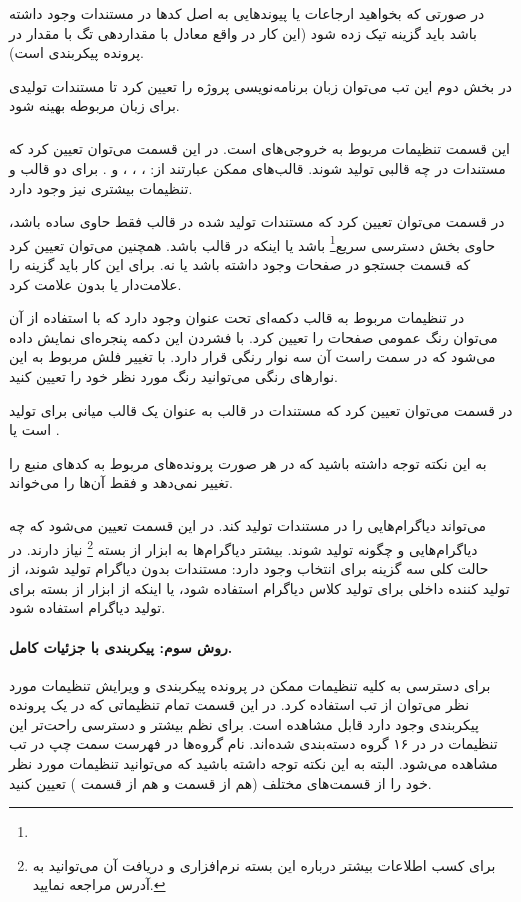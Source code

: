 در صورتی که بخواهید ارجاعات یا پیوندهایی به اصل کدها در مستندات وجود داشته باشد باید 
گزینه  تیک زده شود (این کار در واقع معادل با مقداردهی 
تگ  با مقدار  در پرونده پیکربندی است).

در بخش دوم این تب می‌توان زبان برنامه‌نویسی پروژه را تعیین کرد تا مستندات تولیدی برای زبان مربوطه بهینه شود.
\subparagraph{}
این قسمت تنظیمات مربوط به خروجی‌های  است. در این قسمت می‌توان تعیین کرد که مستندات 
در چه قالبی تولید شوند. قالب‌های ممکن عبارتند از: ، \lr{\LaTeX}، ،  و . 
برای دو قالب  و \lr{\LaTeX} تنظیمات بیشتری نیز وجود دارد.

در قسمت  می‌توان تعیین کرد که مستندات تولید شده در قالب  فقط حاوی  ساده باشد، حاوی 
بخش دسترسی سریع\footnote{} باشد یا اینکه در قالب  باشد. همچنین می‌توان تعیین کرد که 
قسمت جستجو در صفحات  وجود داشته باشد یا نه. برای این کار باید گزینه  را علامت‌دار 
یا بدون علامت کرد.

در تنظیمات مربوط به قالب  دکمه‌ای تحت عنوان  وجود دارد که با استفاده از آن می‌توان 
رنگ عمومی صفحات  را تعیین کرد. با فشردن این دکمه پنجره‌ای نمایش داده می‌شود که در سمت راست آن سه نوار رنگی 
قرار دارد. با تغییر فلش مربوط به این نوارهای رنگی می‌توانید رنگ مورد نظر خود را تعیین کنید.


در قسمت  می‌توان تعیین کرد که مستندات در قالب \lr{\LaTeX} به عنوان یک قالب میانی برای تولید  است 
یا .

به این نکته توجه داشته باشید که در هر صورت  پرونده‌های مربوط به کدهای منبع را تغییر نمی‌دهد و فقط آن‌ها 
را می‌خواند.
\subparagraph{}
\begin{sloppypar}
می‌تواند دیاگرام‌هایی را در مستندات تولید کند. در این قسمت تعیین می‌شود که چه دیاگرام‌هایی و چگونه تولید شوند. 
بیشتر دیاگرام‌ها به ابزار  از بسته 
\footnote{
برای کسب اطلاعات بیشتر درباره این بسته نرم‌افزاری و دریافت آن می‌توانید به آدرس  مراجعه نمایید.}
نیاز دارند. در حالت کلی سه گزینه برای انتخاب وجود دارد: مستندات بدون دیاگرام تولید شوند، از تولید کننده داخلی برای 
تولید کلاس دیاگرام استفاده شود، یا اینکه از ابزار  از بسته  برای تولید دیاگرام استفاده شود.
\end{sloppypar}
\paragraph{روش سوم: پیکربندی با جزئیات کامل.}
برای دسترسی به کلیه تنظیمات ممکن در پرونده پیکربندی و ویرایش تنظیمات مورد نظر می‌توان از تب  
استفاده کرد. در این قسمت تمام تنظیماتی که در یک پرونده پیکربندی  وجود دارد قابل مشاهده است. برای نظم بیشتر 
و دسترسی راحت‌تر این تنظیمات در در ۱۶ گروه دسته‌بندی شده‌اند. نام گروه‌ها در فهرست سمت چپ در تب  مشاهده می‌شود. 
البته به این نکته توجه داشته باشید که می‌توانید تنظیمات مورد نظر خود را از قسمت‌های مختلف (هم از قسمت  و هم 
از قسمت ) تعیین کنید.

